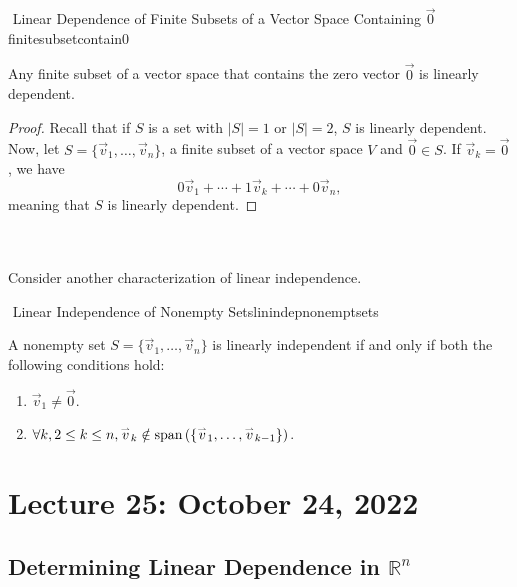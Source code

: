         \begin{theorem}{\Stop\,\,Linear Dependence of Finite Subsets of a Vector Space Containing \(\vec{0}\)}{finitesubsetcontain0}
            
            Any finite subset of a vector space that contains the zero vector \(\vec{0}\) is linearly dependent.
            \begin{proof}
                Recall that if \(S\) is a set with \(|S|=1\) or \(|S|=2\), \(S\) is linearly dependent. Now, let \(S=\{\vec{v}_1,\ldots,\vec{v}_n\}\), a finite subset of a vector space \(V\) and \(\vec{0}\in S\). If \(\vec{v}_k=\vec{0}\), we have
                \begin{equation*}
                    0\vec{v}_1+\cdots+1\vec{v}_k+\cdots+0\vec{v}_n,
                \end{equation*}
                meaning that \(S\) is linearly dependent.
            \end{proof}

        \end{theorem}
        \pagebreak
        \vphantom
        \\
        \\
        Consider another characterization of linear independence.
        \begin{theorem}{\Stop\,\,Linear Independence of Nonempty Sets}{linindepnonemptsets}
        
            A nonempty set \(S=\{\vec{v}_1,\ldots,\vec{v}_n\}\) is linearly independent if and only if both the following conditions hold:
            \begin{enumerate}
                \item \(\vec{v}_1\neq\vec{0}\).
                \item \(\forall k,2\leq k \leq n, \overset{_{\rightharpoonup}}{v}_k\notin\text{span\,}(\{\overset{_{\rightharpoonup}}{v}_1,\ldots,\overset{_{\rightharpoonup}}{v}_{k-1}\})\).
            \end{enumerate}
        
        \end{theorem}

\pagebreak

    \section{Lecture 25: October 24, 2022}

        \subsection{Determining Linear Dependence in \(\mathbb{R}^n\)}

